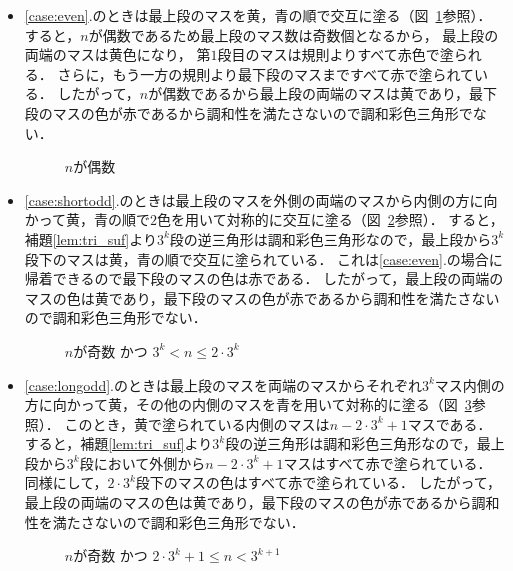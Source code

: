 \begin{itemize}
  \item
    \ref{case:even}.のときは最上段のマスを黄，青の順で交互に塗る（図~\ref{fig:even_steps}参照）．
    すると，$n$が偶数であるため最上段のマス数は奇数個となるから，
    最上段の両端のマスは黄色になり，
    第$1$段目のマスは規則よりすべて赤色で塗られる．
    さらに，もう一方の規則より最下段のマスまですべて赤で塗られている．
    したがって，$n$が偶数であるから最上段の両端のマスは黄であり，最下段のマスの色が赤であるから調和性を満たさないので調和彩色三角形でない．
    \begin{figure}[h]
      \centering
      
      \caption{$n$が偶数}
      \label{fig:even_steps}
    \end{figure}
  \item
    \ref{case:shortodd}.のときは最上段のマスを外側の両端のマスから内側の方に向かって黄，青の順で$2$色を用いて対称的に交互に塗る（図~\ref{fig:shortodd_steps}参照）．
    すると，補題\ref{lem:tri_suf}より$3^k$段の逆三角形は調和彩色三角形なので，最上段から$3^k$段下のマスは黄，青の順で交互に塗られている．
    これは\ref{case:even}.の場合に帰着できるので最下段のマスの色は赤である．
    したがって，最上段の両端のマスの色は黄であり，最下段のマスの色が赤であるから調和性を満たさないので調和彩色三角形でない．
    \begin{figure}[h]
      \centering
      
      \caption{$n$が奇数 かつ $3^{k} < n \leq 2 \cdot 3^{k}$}
      \label{fig:shortodd_steps}
    \end{figure}
  \item
    \ref{case:longodd}.のときは最上段のマスを両端のマスからそれぞれ$3^k$マス内側の方に向かって黄，その他の内側のマスを青を用いて対称的に塗る（図~\ref{fig:longodd_steps}参照）．
    このとき，黄で塗られている内側のマスは$n-2\cdot3^k+1$マスである．
    すると，補題\ref{lem:tri_suf}より$3^k$段の逆三角形は調和彩色三角形なので，最上段から$3^k$段において外側から$n-2\cdot3^k+1$マスはすべて赤で塗られている．
    同様にして，$2\cdot3^k$段下のマスの色はすべて赤で塗られている．
    したがって，最上段の両端のマスの色は黄であり，最下段のマスの色が赤であるから調和性を満たさないので調和彩色三角形でない．
    \begin{figure}[h]
      \centering
      
      \caption{$n$が奇数 かつ $2 \cdot 3^{k} + 1 \leq n < 3^{k+1}$}
      \label{fig:longodd_steps}
    \end{figure}
\end{itemize}

